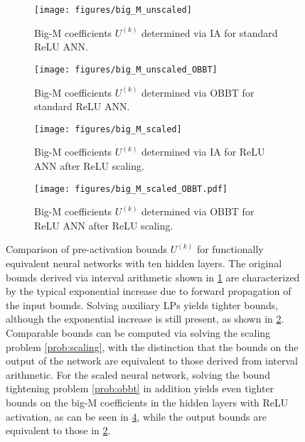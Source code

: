 \begin{figure}
    \centering
    \begin{subfigure}{0.49\textwidth}
        \texttt{[image: figures/big\_M\_unscaled]}
        \caption{Big-M coefficients $U^{(k)}$ determined via IA for standard ReLU ANN.}
        \label{fig:IA_bounds}
    \end{subfigure}
    \hfill
    \begin{subfigure}{0.49\textwidth}
        \texttt{[image: figures/big\_M\_unscaled\_OBBT]}
        \caption{Big-M coefficients $U^{(k)}$ determined via OBBT for standard ReLU ANN.}
        \label{fig:LR_bounds}
    \end{subfigure}
    
    \begin{subfigure}{0.49\textwidth}
        \texttt{[image: figures/big\_M\_scaled]}
        \caption{Big-M coefficients $U^{(k)}$ determined via IA for ReLU ANN after ReLU scaling.}
        \label{fig:scaled_IA_bounds}
    \end{subfigure}
    \hfill
    \begin{subfigure}{0.49\textwidth}
        \texttt{[image: figures/big\_M\_scaled\_OBBT.pdf]}
        \caption{Big-M coefficients $U^{(k)}$ determined via OBBT for ReLU ANN after ReLU scaling.}
        \label{fig:scaled_LR_bounds}
    \end{subfigure}
            
    \caption{Comparison of pre-activation bounds  $U^{(k)}$ for functionally equivalent neural networks with ten hidden layers. The original bounds derived via interval arithmetic shown in \ref{fig:IA_bounds} are characterized by the typical exponential increase due to forward propagation of the input bounds. Solving auxiliary LPs yields tighter bounds, although the exponential increase is still present, as shown in \ref{fig:LR_bounds}. Comparable bounds can be computed via solving the scaling problem \eqref{prob:scaling}, with the distinction that the bounds on the output of the network are equivalent to those derived from interval arithmetic. For the scaled neural network, solving the bound tightening problem \eqref{prob:obbt} in addition yields even tighter bounds on the big-M coefficients in the hidden layers with ReLU activation, as can be seen in \ref{fig:scaled_LR_bounds}, while the output bounds are equivalent to those in \ref{fig:LR_bounds}.}
    \label{fig:big_Ms}
\end{figure}


